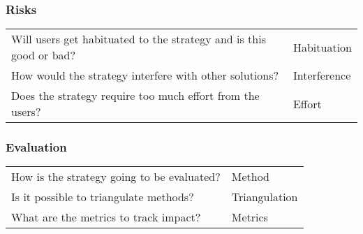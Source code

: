 \subsubsection{Risks}
\begin{tabular}{p{14cm}l}
	Will users get habituated to the strategy and is this good or bad? & Habituation\\
	How would the strategy interfere with other solutions? & Interference\\
	Does the strategy require too much effort from the users? & Effort\\
\end{tabular}

\subsubsection{Evaluation}
\begin{tabular}{p{14cm}l}
	How is the strategy going to be evaluated? & Method\\
	Is it possible to triangulate methods? & Triangulation\\
	What are the metrics to track impact? & Metrics	
\end{tabular}


